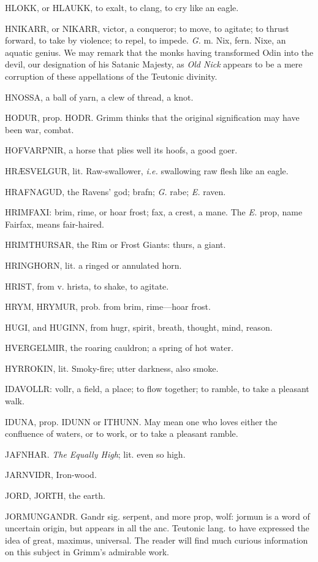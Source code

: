 HLOKK, or HLAUKK, to exalt, to clang, to cry like an eagle.

HNIKARR, or NIKARR, victor, a conqueror; to move, to agitate; to
thrust forward, to take by violence; to repel, to impede. \emph{G.} m. Nix,
fern. Nixe, an aquatic genius. We may remark that the monks having
transformed Odin into the devil, our designation of his Satanic
Majesty, as \emph{Old Nick} appears to be a mere corruption of these
appellations of the Teutonic divinity.

HNOSSA, a ball of yarn, a clew of thread, a knot.

HODUR, prop. HODR. Grimm thinks that the original signification may
have been war, combat.

HOFVARPNIR, a horse that plies well its hoofs, a good goer.

HRÆSVELGUR, lit. Raw-swallower, \emph{i.e.} swallowing raw flesh like an
eagle.

HRAFNAGUD, the Ravens' god; brafn; \emph{G.} rabe; \emph{E.} raven.

HRIMFAXI: brim, rime, or hoar frost; fax, a crest, a mane. The \emph{E.}
prop, name Fairfax, means fair-haired.

HRIMTHURSAR, the Rim or Frost Giants: thurs, a giant.

HRINGHORN, lit. a ringed or annulated horn.

HRIST, from v. hrista, to shake, to agitate.

HRYM, HRYMUR, prob. from brim, rime—hoar frost.

HUGI, and HUGINN, from hugr, spirit, breath, thought, mind, reason.

HVERGELMIR, the roaring cauldron; a spring of hot water.

HYRROKIN, lit. Smoky-fire; utter darkness, also smoke.

IDAVOLLR: vollr, a field, a place; to flow together; to ramble, to
take a pleasant walk.

IDUNA, prop. IDUNN or ITHUNN. May mean one who loves either the
confluence of waters, or to work, or to take a pleasant ramble.

JAFNHAR. \emph{The Equally High}; lit. even so high.

JARNVIDR, Iron-wood.

JORD, JORTH, the earth.

JORMUNGANDR. Gandr sig. serpent, and more prop, wolf: jormun is a word
of uncertain origin, but appears in all the anc. Teutonic lang. to
have expressed the idea of great, maximus, universal. The reader will
find much curious information on this subject in Grimm's admirable
work.

